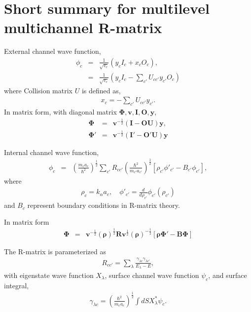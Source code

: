 \documentclass[11pt]{book}
\def\bm{\boldsymbol}
\newcommand{\bea}{\begin{eqnarray}}
\newcommand{\eea}{\end{eqnarray}}
\newcommand{\no}{\nonumber \\}
\begin{document}
\section{Short summary for multilevel multichannel R-matrix}
External channel wave function, 
\bea 
\phi_c &=& \frac{1}{\sqrt{v_c}} (y_c I_c+x_c O_c),\no 
       &=& \frac{1}{\sqrt{v_c}} (y_c I_c-\sum_{c'} U_{cc'} y_{c'} O_c)
\eea 
where Collision matrix $U$ is defined as,
\bea 
x_c = - \sum_{c'} U_{cc'} y_{c'}.
\eea 
In matrix form, with diagonal matrix ${\bm \Phi},{\bm v},{\bm I},{\bm O},{\bm y}$, 
\bea        
{\bm \Phi} &=& {\bm v}^{-\frac{1}{2}} ({{\bm I}-{\bm O}{\bm U}}) {\bm y} ,\no 
{\bm \Phi}' &=& {\bm v}^{-\frac{1}{2}} ({{\bm I}'-{\bm O}'{\bm U}}) {\bm y}
\eea 


Internal channel wave function,
\bea 
\phi_{c}&=& \left( \frac{m_c a_c}{\hbar^2}\right)^{\frac{1}{2}}
           \sum_{c'} R_{cc'} \left( \frac{\hbar^2}{m_{c'} a_{c'}}\right)^{\frac{1}{2}}
           \left[ \rho_{c'} \phi'_{c'}-B_{c'}\phi_{c'}\right],
\eea 
where
\bea 
\rho_c = k_\alpha a_c, \quad \phi'_{c'}=\frac{d}{d\rho_{c'}} \phi_{c'}(\rho_{c'})
\eea 
and $B_c$ represent boundary conditions in R-matrix theory. 

In matrix form 
\bea            
{\bm \Phi}       &=&  {\bm v}^{-\frac{1}{2}} ({\bm\rho})^{\frac{1}{2}}{\bm R}
{\bm v}^{\frac{1}{2}}({\bm \rho})^{-\frac{1}{2}}
\left[ {\bm \rho} {\bm \Phi}'-{\bm B}{\bm \Phi}\right]   
\eea 


The R-matrix is parameterized as
\bea 
R_{cc'}=\sum_{\lambda} \frac{\gamma_{\lambda c}\gamma_{\lambda c'}}{E_\lambda-E},
\eea 
with eigenstate wave function $X_\lambda$, surface channel wave function $\psi_c$, 
and surface integral, 
\bea 
\gamma_{\lambda c}=\left( \frac{\hbar^2}{m_{c} a_{c}}\right)^{\frac{1}{2}}
                   \int d S X_\lambda^* \psi_c. 
\eea 
\end{document}
